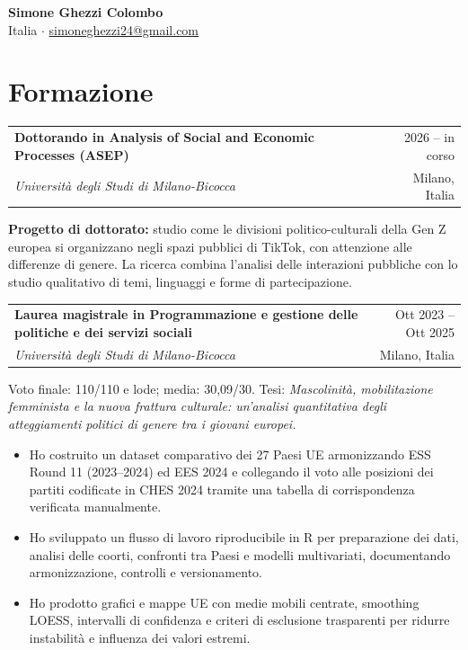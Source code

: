 \documentclass[11pt,a4paper]{article}
\makeatletter
\newcommand{\nameheader}[3]{%
  {\LARGE\bfseries #1}\\[0.35em]
  #2 \enspace $\cdot$ \enspace \href{mailto:#3}{#3}\\[0.2em]
}
\newcommand{\cventry}[4]{%
  \begin{tabularx}{\textwidth}{@{}Xr@{}}
    {\textbf{#1}} & {#4}\\
    {\emph{#2}} & {#3}
  \end{tabularx}\vspace{0.2em}
}
\makeatother
\begin{document}
\nameheader{Simone Ghezzi Colombo}{Italia}{simoneghezzi24@gmail.com}

\section*{Formazione}

\cventry{Dottorando in Analysis of Social and Economic Processes (ASEP)}{Università degli Studi di Milano-Bicocca}{Milano, Italia}{2026 -- in corso}
\textbf{Progetto di dottorato:} studio come le divisioni politico-culturali della Gen Z europea si organizzano negli spazi pubblici di TikTok, con attenzione alle differenze di genere. La ricerca combina l'analisi delle interazioni pubbliche con lo studio qualitativo di temi, linguaggi e forme di partecipazione.

\cventry{Laurea magistrale in Programmazione e gestione delle politiche e dei servizi sociali}{Università degli Studi di Milano-Bicocca}{Milano, Italia}{Ott 2023 -- Ott 2025}
Voto finale: 110/110 e lode; media: 30,09/30. Tesi: \emph{Mascolinità, mobilitazione femminista e la nuova frattura culturale: un'analisi quantitativa degli atteggiamenti politici di genere tra i giovani europei.}
\begin{itemize}
  \item Ho costruito un dataset comparativo dei 27 Paesi UE armonizzando ESS Round 11 (2023--2024) ed EES 2024 e collegando il voto alle posizioni dei partiti codificate in CHES 2024 tramite una tabella di corrispondenza verificata manualmente.
  \item Ho sviluppato un flusso di lavoro riproducibile in R per preparazione dei dati, analisi delle coorti, confronti tra Paesi e modelli multivariati, documentando armonizzazione, controlli e versionamento.
  \item Ho prodotto grafici e mappe UE con medie mobili centrate, smoothing LOESS, intervalli di confidenza e criteri di esclusione trasparenti per ridurre instabilità e influenza dei valori estremi.
\end{itemize}
\end{document}

